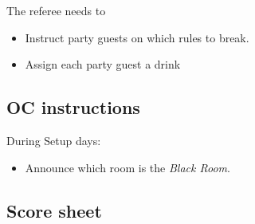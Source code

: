 The referee needs to
\begin{itemize}
	\item Instruct party guests on which rules to break.
	\item Assign each party guest a drink
\end{itemize}

\subsection*{OC instructions}
During Setup days:
\begin{itemize}
	\item Announce which room is the \textit{Black Room}.
\end{itemize}

\subsection*{Score sheet}



